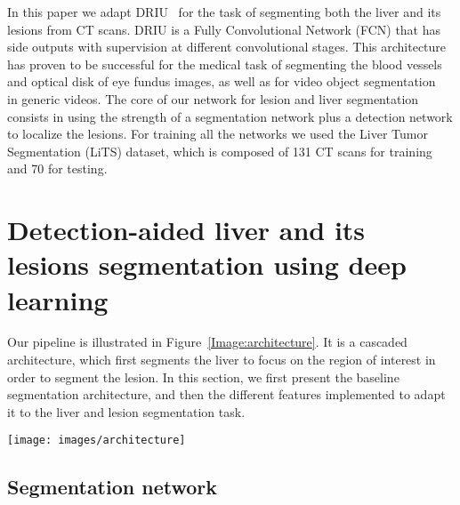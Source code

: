 \documentclass{article}
\begin{document}
In this paper we adapt DRIU~\cite{maninis2016deep} for the task of segmenting both the liver and its lesions from CT scans. DRIU is a Fully Convolutional Network (FCN) that has side outputs with supervision at different convolutional stages. This architecture has proven to be successful for the medical task of segmenting the blood vessels and optical disk of eye fundus images, as well as for video object segmentation~\cite{caelles2016one} in generic videos. The core of our network for lesion and liver segmentation consists in using the strength of a segmentation network plus a detection network to localize the lesions. For training all the networks we used the Liver Tumor Segmentation (LiTS) dataset, which is composed of 131 CT scans for training and 70 for testing. 

\section{Detection-aided liver and its lesions segmentation using deep learning}

Our pipeline is illustrated in Figure~\ref{Image:architecture}. It is a cascaded architecture, which first segments the liver to focus on the region of interest in order to segment the lesion. In this section, we first present the baseline segmentation architecture, and then the different features implemented to adapt it to the liver and lesion segmentation task.

\begin{figure*}[h!]
  \centering
  \texttt{[image: images/architecture]}
  \caption[Stack of slices as input]{Architecture for the detection-aided liver and its lesions segmentation. The first stage consists in segmenting the liver. Once we have the liver prediction, we place a 3D bounding box around the liver, and the different slices cropped by this bounding box are segmented by the lesion segmentation network. The detection network operates on patches sampled around the liver. Finally, we only keep the positive detections that agree with the segmentation of the lesion.}
  \label{Image:architecture}
\end{figure*}

\subsection{Segmentation network}
\label{seg-net}
\end{document}
